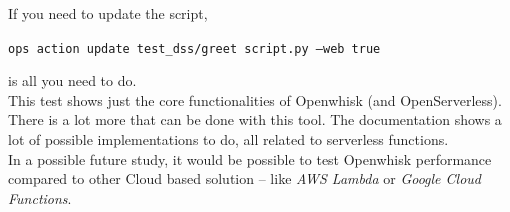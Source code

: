 If you need to update the script, 
\begin{center}
    \colorbox{codegray}{\texttt{ops action update test\_dss/greet script.py --web true}}
\end{center}
is all you need to do.\vspace{14pt}\\
This test shows just the core functionalities of Openwhisk (and OpenServerless). There is a lot more that can be done with this tool. The documentation shows a lot of possible implementations to do, all related to serverless functions.\vspace{14pt}\\
In a possible future study, it would be possible to test Openwhisk performance compared to other Cloud based solution -- like \textit{AWS Lambda} or \textit{Google Cloud Functions}.